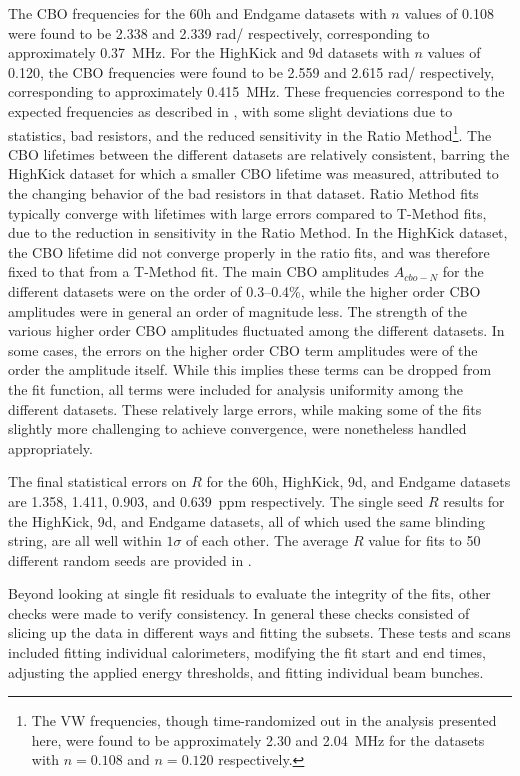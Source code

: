 The CBO frequencies for the 60h and Endgame datasets with $n$ values of 0.108 were found to be 2.338 and 2.339 rad/\mus{} respectively, corresponding to approximately \SI{0.37}{MHz}. For the HighKick and 9d datasets with $n$ values of 0.120, the CBO frequencies were found to be 2.559 and 2.615 rad/\mus{} respectively, corresponding to approximately \SI{0.415}{MHz}. These frequencies correspond to the expected frequencies as described in , with some slight deviations due to statistics, bad resistors, and the reduced sensitivity in the Ratio Method\footnote{The VW frequencies, though time-randomized out in the analysis presented here, were found to be approximately \SI{2.30}{} and \SI{2.04}{MHz} for the datasets with $n=0.108$ and $n=0.120$ respectively.}. The CBO lifetimes between the different datasets are relatively consistent, barring the HighKick dataset for which a smaller CBO lifetime was measured, attributed to the changing behavior of the bad resistors in that dataset. Ratio Method fits typically converge with lifetimes with large errors compared to T-Method fits, due to the reduction in sensitivity in the Ratio Method. In the HighKick dataset, the CBO lifetime did not converge properly in the ratio fits, and was therefore fixed to that from a T-Method fit. The main CBO amplitudes $A_{cbo-N}$ for the different datasets were on the order of 0.3--0.4\%, while the higher order CBO amplitudes were in general an order of magnitude less. The strength of the various higher order CBO amplitudes fluctuated among the different datasets. In some cases, the errors on the higher order CBO term amplitudes were of the order the amplitude itself. While this implies these terms can be dropped from the fit function, all terms were included for analysis uniformity among the different datasets. These relatively large errors, while making some of the fits slightly more challenging to achieve convergence, were nonetheless handled appropriately.



The final statistical errors on $R$ for the 60h, HighKick, 9d, and Endgame datasets are \SI{1.358}{}, \SI{1.411}{}, \SI{0.903}{}, and \SI{0.639}{ppm} respectively. The single seed $R$ results for the HighKick, 9d, and Endgame datasets, all of which used the same blinding string, are all well within $1\sigma$ of each other. The average $R$ value for fits to 50 different random seeds are provided in .


Beyond looking at single fit residuals to evaluate the integrity of the fits, other checks were made to verify consistency. In general these checks consisted of slicing up the data in different ways and fitting the subsets. These tests and scans included fitting individual calorimeters, modifying the fit start and end times, adjusting the applied energy thresholds, and fitting individual beam bunches.





